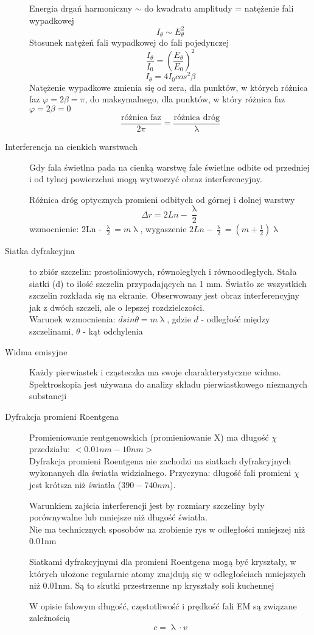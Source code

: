 \documentclass[a4paper,11pt]{article}
\begin{document}
\begin{description}
  Energia drgań harmoniczny $\sim$ do kwadratu amplitudy = natężenie fali wypadkowej
  $$I_\theta \sim E^2_\theta$$
  Stosunek natężeń fali wypadkowej do fali pojedynczej
  $$\frac{I_\theta}{I_0}=\left(\frac{E_\theta}{E_0}\right)^2$$
  $$I_\theta = 4I_0cos^2\beta$$
  Natężenie wypadkowe zmienia się od zera, dla punktów, w których różnica faz $\varphi=2\beta=\pi$, do maksymalnego, dla punktów, w który różnica faz $\varphi=2\beta=0$
  $$\frac{\text{różnica faz}}{2\pi}=\frac{\text{różnica dróg}}{\uplambda}$$
\item[Interferencja na cienkich warstwach] Gdy fala świetlna pada na cienką warstwę fale świetlne odbite od przedniej i od tylnej powierzchni mogą wytworzyć obraz interferencyjny.

  Różnica dróg optycznych promieni odbitych od górnej i dolnej warstwy
  $$\Delta r = 2Ln - \frac{\uplambda}{2}$$
  wzmocnienie: 2Ln - $\frac{\uplambda}{2} = m\uplambda$, wygaszenie $2Ln - \frac{\uplambda}{2}=\left(m+\frac{1}{2}\right)\uplambda$
\item[Siatka dyfrakcyjna] to zbiór szczelin: prostoliniowych, równoległych i równoodległych. Stała siatki (d) to ilość szczelin przypadających na 1 mm. Światło ze wszystkich szczelin rozkłada się na ekranie. Obserwowany jest obraz interferencyjny jak z dwóch szczeli, ale o lepszej rozdzielczości.\\
  Warunek wzmocnienia: $dsin\theta =m\uplambda$, gdzie $d$ - odległość między szczelinami, $\theta$ - kąt odchylenia
\item[Widma emisyjne] Każdy pierwiastek i cząsteczka ma swoje charakterystyczne widmo. Spektroskopia jest używana do analizy składu pierwiastkowego nieznanych substancji
\item[Dyfrakcja promieni Roentgena] Promieniowanie rentgenowskich (promieniowanie X) ma długość $\chi$ przedziału: $<0.01nm-10nm>$ \\
  Dyfrakcja promieni Roentgena nie zachodzi na siatkach dyfrakcyjnych wykonanych dla światła widzialnego. Przyczyna: długość fali promieni $\chi$ jest krótsza niż światła ($390-740nm$).

  Warunkiem zajścia interferencji jest by rozmiary szczeliny były porównywalne lub mniejsze niż długość światła.\\
  Nie ma technicznych sposobów na zrobienie rys w odległości mniejszej niż 0.01nm

  Siatkami dyfrakcyjnymi dla promieni Roentgena mogą być kryształy, w których ułożone regularnie atomy znajdują się w odległościach mniejszych niż 0.01nm. Są to skutki przestrzenne np kryształy soli kuchennej

  W opisie falowym długość, częstotliwość i prędkość fali EM są związane zależnością 
  $$c=\uplambda\cdot v$$
\end{description}
\end{document}
